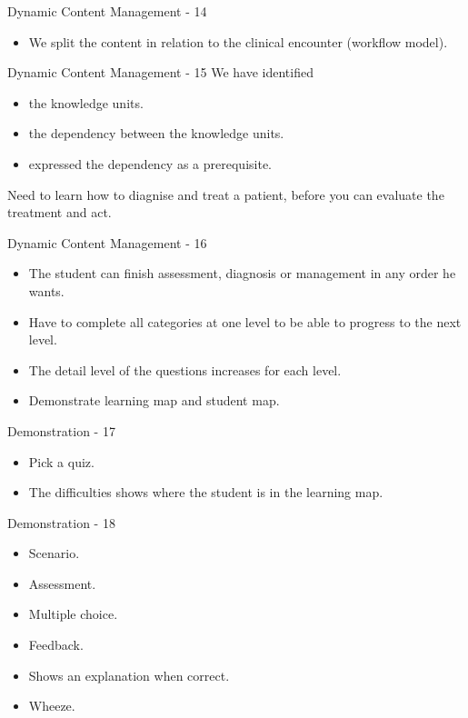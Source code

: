 \documentclass{beamer}
\begin{document}
\begin{frame}{Dynamic Content Management - 14}
\begin{itemize}
	\item We split the content in relation to the clinical encounter (workflow model).
\end{itemize}
\end{frame}

\begin{frame}{Dynamic Content Management - 15}
We have identified
\begin{itemize}
	\item  the knowledge units.
	\item the dependency between the knowledge units.
	\item expressed the dependency as a prerequisite.
\end{itemize}
Need to learn how to diagnise and treat a patient, before you can evaluate the treatment and act.
\end{frame}

\begin{frame}{Dynamic Content Management - 16}
\begin{itemize}
	\item The student can finish assessment, diagnosis or management in any order he wants.
	\item Have to complete all categories at one level to be able to progress to the next level.
	\item The detail level of the questions increases for each level.
	\item Demonstrate learning map and student map. 
\end{itemize}
\end{frame}

\begin{frame}{Demonstration - 17}
\begin{itemize}
	\item Pick a quiz.
	\item The difficulties shows where the student is in the learning map.
\end{itemize}
\end{frame}

\begin{frame}{Demonstration - 18}
\begin{itemize}
	\item Scenario.
	\item Assessment.
	\item Multiple choice.
	\item Feedback.
	\item Shows an explanation when correct.
	\item Wheeze.
\end{itemize}
\end{frame}
\end{document}
